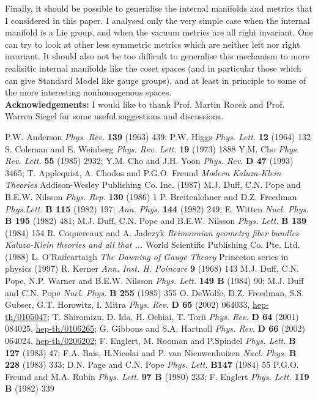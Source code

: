 \documentclass[a4paper,12pt]{article}
\def\hhref#1{\href{http://arxiv.org/abs/hep-th/#1}{hep-th/#1}}
\begin{document}
Finally, it should be possible to generalise the internal manifolds and metrics that I considered in this paper. I analysed only the very simple case when the internal manifold is a Lie group, and when the vacuum metrics are all right invariant. One can try to look at other less symmetric metrics which are neither left nor right invariant. It should also not be too difficult to generalise this mechanism to more realisitic internal manifolds like the coset spaces (and in particular those which can give Standard Model like gauge groups), and at least in principle to some of the more interesting nonhomogenous spaces. 
\vspace{5mm}\\
{\large {\bf Acknowledgements:}} I would like to thank Prof. Martin Rocek and Prof. Warren Siegel for some useful suggestions and discussions.


\begin{thebibliography}{99}

 P.W. Anderson {\it Phys. Rev.} {\bf 139} (1963) 439; P.W. Higgs {\it Phys. Lett.} {\bf 12} (1964) 132
 S. Coleman and E. Weinberg {\it Phys. Rev. Lett.} {\bf 19} (1973) 1888
 Y.M. Cho {\it Phys. Rev. Lett.} {\bf 55} (1985) 2932; Y.M. Cho and J.H. Yoon {\it Phys. Rev. } {\bf D 47} (1993) 3465; 
 T. Applequist, A. Chodos and P.G.O. Freund {\it Modern Kaluza-Klein Theories} Addison-Wesley Publishing Co. Inc. (1987)
 M.J. Duff, C.N. Pope and B.E.W. Nilsson {\it Phys. Rep.} {\bf 130} (1986) 1
 P. Breitenlohner and D.Z. Freedman {\it Phys.Lett.} {\bf B 115 } (1982) 197; {\it Ann. Phys.} {\bf 144} (1982) 249; E. Witten {\it Nucl. Phys.} {\bf B 195} (1982) 481; M.J. Duff, C.N. Pope and B.E.W. Nilsson {\it Phys. Lett.} {\bf B 139} (1984) 154
 R. Coquereaux and A. Jadczyk {\it Reimannian geometry fiber bundles Kaluza-Klein theories and all that ...} World Scientific Publishing Co. Pte. Ltd. (1988)
 L. O'Raifeartaigh {\it The Dawning of Gauge Theory} Princeton series in physics (1997)
 R. Kerner {\it Ann. Inst. H. Poincare} {\bf 9} (1968) 143  
  M.J. Duff, C.N. Pope, N.P. Warner and B.E.W. Nilsson {\it Phys. Lett.} {\bf 149 B} (1984) 90;  M.J. Duff and  C.N. Pope {\it Nucl. Phys.} {\bf B 255} (1985) 355
  O. DeWolfe, D.Z. Freedman, S.S. Gubser, G.T. Horowitz, I. Mitra {\it Phys. Rev.} {\bf D 65} (2002) 064033, \hhref{0105047};  T. Shiromizu, D. Ida, H. Ochiai, T. Torii {\it Phys. Rev.} {\bf D 64} (2001) 084025, \hhref{0106265}; G. Gibbons and S.A. Hartnoll  {\it Phys. Rev.} {\bf D 66} (2002) 064024, \hhref{0206202}; 
 F. Englert, M. Rooman and P.Spindel {\it Phys. Lett.} {\bf B 127} (1983) 47; F.A. Bais, H.Nicolai and P. van Nieuwenhuizen {\it Nucl. Phys.} {\bf B 228} (1983) 333; D.N. Page and C.N. Pope {\it Phys. Lett.} {\bf B147} (1984) 55 
  P.G.O. Freund and M.A. Rubin {\it Phys. Lett.} {\bf 97 B} (1980) 233;  F. Englert {\it Phys. Lett.} {\bf 119 B} (1982) 339

\end{thebibliography}
\end{document}
